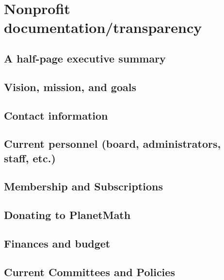 \documentclass[12pt,report]{memoir}
\begin{document}
\chapter{Nonprofit documentation/transparency}


\section{A half-page executive summary}


\section{Vision, mission, and goals}


\section{Contact information}


\section{Current personnel (board, administrators, staff, etc.)}


\section{Membership and Subscriptions}


\section{Donating to PlanetMath}


\section{Finances and budget}


\section{Current Committees and Policies}

%
\end{document}
